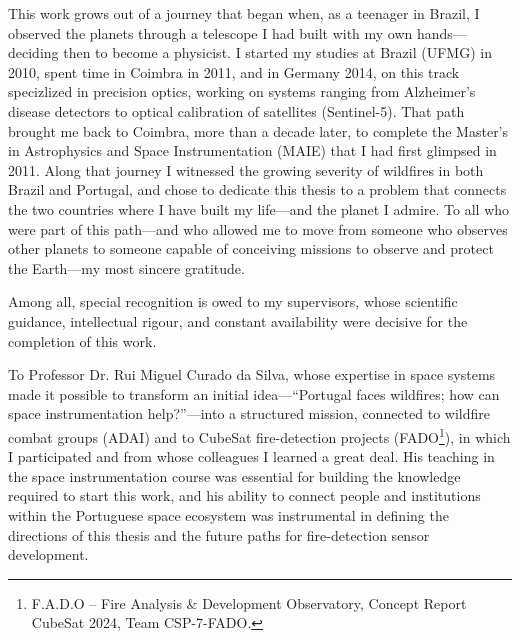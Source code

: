 

This work grows out of a journey that began when, as a teenager in Brazil, I observed the planets through a telescope I had built with my own hands---deciding then to become a physicist. I started my studies at Brazil (UFMG) in 2010, spent time in Coimbra in 2011, and in Germany 2014, on this track specizlized in precision optics, working on systems ranging from Alzheimer's disease detectors to optical calibration of satellites (Sentinel-5). That path brought me back to Coimbra, more than a decade later, to complete the Master's in Astrophysics and Space Instrumentation (MAIE) that I had first glimpsed in 2011. Along that journey I witnessed the growing severity of wildfires in both Brazil and Portugal, and chose to dedicate this thesis to a problem that connects the two countries where I have built my life---and the planet I admire. To all who were part of this path---and who allowed me to move from someone who observes other planets to someone capable of conceiving missions to observe and protect the Earth---my most sincere gratitude.

Among all, special recognition is owed to my supervisors, whose scientific guidance, intellectual rigour, and constant availability were decisive for the completion of this work.

To Professor Dr. Rui Miguel Curado da Silva, whose expertise in space systems made it possible to transform an initial idea---``Portugal faces wildfires; how can space instrumentation help?''---into a structured mission, connected to wildfire combat groups (ADAI) and to CubeSat fire-detection projects (FADO\footnote{F.A.D.O -- Fire Analysis \& Development Observatory, Concept Report CubeSat 2024, Team CSP-7-FADO.}), in which I participated and from whose colleagues I learned a great deal. His teaching in the space instrumentation course was essential for building the knowledge required to start this work, and his ability to connect people and institutions within the Portuguese space ecosystem was instrumental in defining the directions of this thesis and the future paths for fire-detection sensor development.

